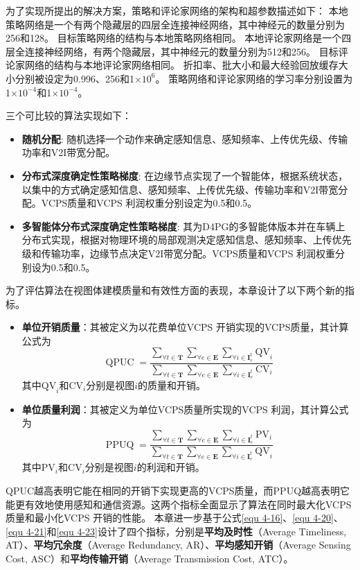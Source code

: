 为了实现所提出的解决方案，策略和评论家网络的架构和超参数描述如下：
本地策略网络是一个有两个隐藏层的四层全连接神经网络，其中神经元的数量分别为256和128。
目标策略网络的结构与本地策略网络相同。
本地评论家网络是一个四层全连接神经网络，有两个隐藏层，其中神经元的数量分别为512和256。
目标评论家网络的结构与本地评论家网络相同。
折扣率、批大小和最大经验回放缓存大小分别被设定为0.996、256和1$\times10^{6}$。
策略网络和评论家网络的学习率分别设置为1$\times10^{-4}$和1$\times10^{-4}$。

三个可比较的算法实现如下：
\begin{itemize}
	\item \textbf{随机分配}: 随机选择一个动作来确定感知信息、感知频率、上传优先级、传输功率和V2I带宽分配。
	\item \textbf{分布式深度确定性策略梯度}\cite{barth2018distributed}: 在边缘节点实现了一个智能体，根据系统状态，以集中的方式确定感知信息、感知频率、上传优先级、传输功率和V2I带宽分配。VCPS质量和VCPS 利润权重分别设定为0.5和0.5。
	\item \textbf{多智能体分布式深度确定性策略梯度}: 其为D4PG的多智能体版本并在车辆上分布式实现，根据对物理环境的局部观测决定感知信息、感知频率、上传优先级和传输功率，边缘节点决定V2I带宽分配。VCPS质量和VCPS 利润权重分别设为0.5和0.5。
\end{itemize}

为了评估算法在视图体建模质量和有效性方面的表现，本章设计了以下两个新的指标。
\begin{itemize}
	\item \textbf{单位开销质量}：其被定义为以花费单位VCPS 开销实现的VCPS质量，其计算公式为
		\begin{equation}
			\operatorname{QPUC}=\frac{\sum_{\forall t \in \mathbf{T}} \sum_{\forall e \in \mathbf{E}} \sum_{\forall i \in \mathbf{I}_e^t} \mathrm{QV}_i}{\sum_{\forall t \in \mathbf{T}} \sum_{\forall e \in \mathbf{E}} \sum_{\forall i \in \mathbf{I}_e^t} \mathrm{CV}_i}
		\end{equation}
		其中$\mathrm{QV}_i$和$\mathrm{CV}_i$分别是视图$i$的质量和开销。
	\item \textbf{单位质量利润}：其被定义为单位VCPS质量所实现的VCPS 利润，其计算公式为
		\begin{equation}
		\operatorname{PPUQ}=\frac{\sum_{\forall t \in \mathbf{T}} \sum_{\forall e \in \mathbf{E}} \sum_{\forall i \in \mathbf{I}_e^t}\mathrm{PV}_i}{\sum_{\forall t \in \mathbf{T}} \sum_{\forall e \in \mathbf{E}} \sum_{\forall i \in \mathbf{I}_e^t} \mathrm{QV}_i}
		\end{equation}
		其中$\mathrm{PV}_i$和$\mathrm{CV}_i$分别是视图$i$的利润和开销。
\end{itemize}
QPUC越高表明它能在相同的开销下实现更高的VCPS质量，而PPUQ越高表明它能更有效地使用感知和通信资源。这两个指标全面显示了算法在同时最大化VCPS质量和最小化VCPS 开销的性能。
本章进一步基于公式\ref{equ 4-16}、\ref{equ 4-20}、\ref{equ 4-21}和\ref{equ 4-23}设计了四个指标，分别是\textbf{平均及时性}（Average Timeliness, AT）、\textbf{平均冗余度}（Average Redundancy, AR）、\textbf{平均感知开销}（Average Sensing Cost, ASC）和\textbf{平均传输开销}（Average Transmission Cost, ATC）。 

